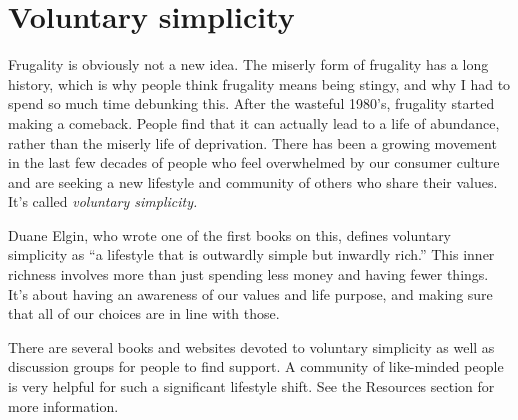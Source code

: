 \section{Voluntary simplicity}
Frugality is obviously not a new idea. The miserly form of frugality has a long history, which is why people think frugality means being stingy, and why I had to spend so much time debunking this. After the wasteful 1980's, frugality started making a comeback. People find that it can actually lead to a life of abundance, rather than the miserly life of deprivation. There has been a growing movement in the last few decades of people who feel overwhelmed by our consumer culture and are seeking a new lifestyle and community of others who share their values. It's called \emph{voluntary simplicity.}

Duane Elgin, who wrote one of the first books on this, defines voluntary simplicity as ``a lifestyle that is outwardly simple but inwardly rich.''\cite{voluntary-simplicity} This inner richness involves more than just spending less money and having fewer things. It's about having an awareness of our values and life purpose, and making sure that all of our choices are in line with those.

There are several books and websites devoted to voluntary simplicity as well as discussion groups for people to find support. A community of like-minded people is very helpful for such a significant lifestyle shift. See the Resources section for more information.

\newpage
